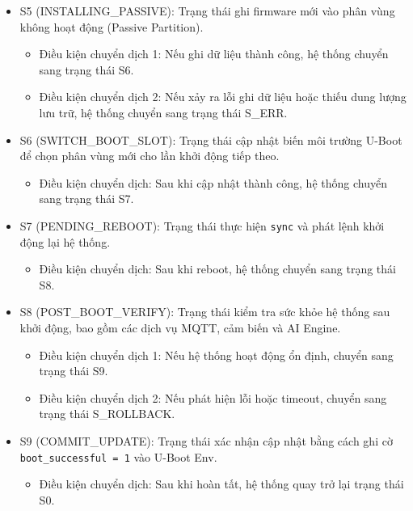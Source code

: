 \begin{itemize}
    \item S5 (INSTALLING\_PASSIVE): Trạng thái ghi firmware mới vào phân vùng không hoạt động (Passive Partition).
    \begin{itemize}
        \item Điều kiện chuyển dịch 1: Nếu ghi dữ liệu thành công, hệ thống chuyển sang trạng thái S6.
        \item Điều kiện chuyển dịch 2: Nếu xảy ra lỗi ghi dữ liệu hoặc thiếu dung lượng lưu trữ, hệ thống chuyển sang trạng thái S\_ERR.
    \end{itemize}

    \item S6 (SWITCH\_BOOT\_SLOT): Trạng thái cập nhật biến môi trường U-Boot để chọn phân vùng mới cho lần khởi động tiếp theo.
    \begin{itemize}
        \item Điều kiện chuyển dịch: Sau khi cập nhật thành công, hệ thống chuyển sang trạng thái S7.
    \end{itemize}

    \item S7 (PENDING\_REBOOT): Trạng thái thực hiện \texttt{sync} và phát lệnh khởi động lại hệ thống.
    \begin{itemize}
        \item Điều kiện chuyển dịch: Sau khi reboot, hệ thống chuyển sang trạng thái S8.
    \end{itemize}

    \item S8 (POST\_BOOT\_VERIFY): Trạng thái kiểm tra sức khỏe hệ thống sau khởi động, bao gồm các dịch vụ MQTT, cảm biến và AI Engine.
    \begin{itemize}
        \item Điều kiện chuyển dịch 1: Nếu hệ thống hoạt động ổn định, chuyển sang trạng thái S9.
        \item Điều kiện chuyển dịch 2: Nếu phát hiện lỗi hoặc timeout, chuyển sang trạng thái S\_ROLLBACK.
    \end{itemize}

    \item S9 (COMMIT\_UPDATE): Trạng thái xác nhận cập nhật bằng cách ghi cờ \texttt{boot\_successful = 1} vào U-Boot Env.
    \begin{itemize}
        \item Điều kiện chuyển dịch: Sau khi hoàn tất, hệ thống quay trở lại trạng thái S0.
    \end{itemize}


\end{itemize}
